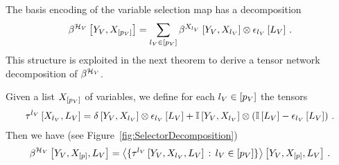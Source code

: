 The basis encoding of the variable selection map has a decomposition
\begin{align*}
    \beta^{\mathcal{H}_{V}}\left[Y_{V},X_{[p_{V}]}\right]
    = \sum_{l_{V}\in[p_{V}]}
    \beta^{X_{l_{V}}}\left[Y_{V},X_{l_{V}}\right] \otimes  \epsilon_{l_{V}}\left[L_{V}\right] \, .
\end{align*}
This structure is exploited in the next theorem to derive a tensor network decomposition of $\beta^{\mathcal{H}_{V}}$.

\begin{theorem}
    \label{the:varSelectorDecomposition}
    Given a list $X_{[p_{V}]}$ of variables, we define for each $l_{V}\in[p_{V}]$ the tensors
    \begin{align*}
        \tau^{{l_{V}}}\left[X_{l_{V}},L_{V}\right]
        = \delta\left[Y_{V},X_{l_{V}}\right] \otimes \epsilon_{l_{V}}\left[L_{V}\right]
        + \mathbb{I}\left[Y_{V},X_{l_{V}}\right]
        \otimes \left(\mathbb{I}\left[L_{V}\right] - \epsilon_{l_{V}}\left[L_{V}\right] \right) \, .
    \end{align*}
    Then we have (see Figure~\ref{fig:SelectorDecomposition})
    \[ \beta^{\mathcal{H}_{V}}\left[Y_{V},X_{[p]},L_{V}\right]
    = \left\langle 
        \{\tau^{{l_{V}}}\left[Y_{V},X_{l_{V}},L_{V}\right] \, : \, l_{V}\in[p_{V}]\}
    \right\rangle \left[ Y_{V},X_{[p]},L_{V} \right] \, .
    \]
\end{theorem}
